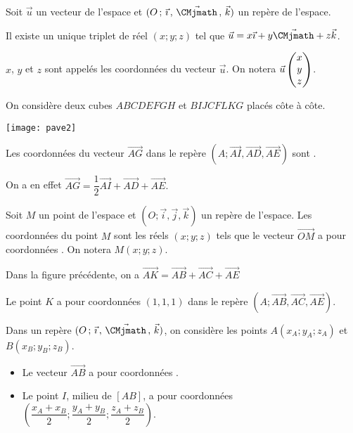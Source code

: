 \documentclass[11pt,fleqn, openany]{book} %
\begin{document}
\begin{proposition}Soit $\vec u$ un vecteur de l'espace et  $\Oijk$ un repère de l'espace. 

Il existe un unique triplet de réel $(x;y;z)$ tel que $\vec u = x \vec {\imath} + y \vec {\CMjmath} + z \vec k$.

$x$, $y$ et $z$ sont appelés les coordonnées du vecteur $\vec u$. On notera $\vec u\renewcommand{\arraystretch}{1} \renewcommand{\arraystretch}{1}\begin{pmatrix}x\\y\\z\end{pmatrix}$. \end{proposition}

\begin{example}On considère deux cubes $ABCDEFGH$ et $BIJCFLKG$ placés côte à côte.

\begin{center}
\texttt{[image: pave2]}
\end{center}

Les coordonnées du vecteur $\overrightarrow{AG}$ dans le repère $(A;\overrightarrow{AI}, \overrightarrow{AD}, \overrightarrow{AE})$ sont \renewcommand{\arraystretch}{1}. 

On a en effet $\overrightarrow{AG}=\dfrac{1}{2}\overrightarrow{AI}+\overrightarrow{AD}+\overrightarrow{AE}.$\end{example}

\begin{definition}Soit $M$ un point de l'espace et $(O;\vec i , \vec j ,\vec k)$ un repère de l'espace. Les coordonnées du point $M$ sont les réels $(x;y;z)$ tels que le vecteur $\overrightarrow{OM}$ a pour coordonnées \renewcommand{\arraystretch}{1}. On notera $M(x;y;z)$. \end{definition}

\begin{example}Dans la figure précédente, on a  $\overrightarrow{AK}=\overrightarrow{AB}+\overrightarrow{AC}+\overrightarrow{AE}$ 

Le point $K$ a pour coordonnées $(1,1,1)$ dans le repère $(A;\overrightarrow{AB}, \overrightarrow{AC}, \overrightarrow{AE})$.
\end{example}

\begin{proposition}Dans un repère  $\Oijk$, on considère les points $A(x_A;y_A;z_A)$ et $B(x_B;y_B;z_B)$.
\begin{itemize}
\item Le vecteur $\overrightarrow{AB}$ a pour coordonnées \renewcommand{\arraystretch}{1}.
\item Le point $I$, milieu de $[AB]$, a pour coordonnées $\left( \dfrac{x_A+x_B}{2} ; \dfrac{y_A+y_B}{2} ; \dfrac{z_A+z_B}{2} \right)$.
\end{itemize}\end{proposition}
\end{document}
